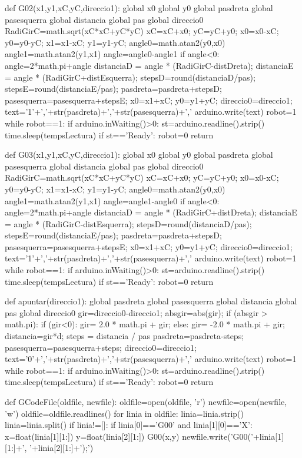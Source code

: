 \begin{python}
	def G02(x1,y1,xC,yC,direccio1):
		global x0
		global y0
		global pasdreta
		global pasesquerra
		global distancia
		global pas
		global direccio0
		RadiGirC=math.sqrt(xC*xC+yC*yC)
		xC=xC+x0;
		yC=yC+y0;
		x0=x0-xC;
		y0=y0-yC;
		x1=x1-xC;
		y1=y1-yC;
		angle0=math.atan2(y0,x0)
		angle1=math.atan2(y1,x1)
		angle=angle0-angle1
		if angle<0:
			angle=2*math.pi+angle
		distanciaD = angle * (RadiGirC-distDreta);
		distanciaE = angle * (RadiGirC+distEsquerra);
		stepsD=round(distanciaD/pas);
		stepsE=round(distanciaE/pas);
		pasdreta=pasdreta+stepsD;
		pasesquerra=pasesquerra+stepsE;
		x0=x1+xC;
		y0=y1+yC;
		direccio0=direccio1;
		text='1'+','+str(pasdreta)+','+str(pasesquerra)+','
		arduino.write(text)
		robot=1
		while robot==1:
			if arduino.inWaiting()>0:
				st=arduino.readline().strip()
				time.sleep(tempsLectura)
				if st=='Ready':
					robot=0
		return
	
	def G03(x1,y1,xC,yC,direccio1):
		global x0
		global y0
		global pasdreta
		global pasesquerra
		global distancia
		global pas
		global direccio0
		RadiGirC=math.sqrt(xC*xC+yC*yC)
		xC=xC+x0;
		yC=yC+y0;
		x0=x0-xC;
		y0=y0-yC;
		x1=x1-xC;
		y1=y1-yC;
		angle0=math.atan2(y0,x0)
		angle1=math.atan2(y1,x1)
		angle=angle1-angle0
		if angle<0:
			angle=2*math.pi+angle
		distanciaD = angle * (RadiGirC+distDreta);
		distanciaE = angle * (RadiGirC-distEsquerra);
		stepsD=round(distanciaD/pas);
		stepsE=round(distanciaE/pas);
		pasdreta=pasdreta+stepsD;
		pasesquerra=pasesquerra+stepsE;
		x0=x1+xC;
		y0=y1+yC;
		direccio0=direccio1;
		text='1'+','+str(pasdreta)+','+str(pasesquerra)+','
		arduino.write(text)
		robot=1
		while robot==1:
			if arduino.inWaiting()>0:
				st=arduino.readline().strip()
				time.sleep(tempsLectura)
				if st=='Ready':
					robot=0
		return
	
	def apuntar(direccio1):
		global pasdreta
		global pasesquerra
		global distancia
		global pas
		global direccio0
		gir=direccio0-direccio1;
		absgir=abs(gir);
		if (absgir > math.pi):
			if (gir<0):
				gir= 2.0 * math.pi + gir;
			else:
				gir= -2.0 * math.pi + gir;
		distancia=gir*d;
		steps = distancia / pas
		pasdreta=pasdreta-steps;
		pasesquerra=pasesquerra+steps;
		direccio0=direccio1;
		text='0'+','+str(pasdreta)+','+str(pasesquerra)+','
		arduino.write(text)
		robot=1
		while robot==1:
			if arduino.inWaiting()>0:
				st=arduino.readline().strip()
				time.sleep(tempsLectura)
				if st=='Ready':
					robot=0
		return
	
	
	def GCodeFile(oldfile, newfile):
		oldfile=open(oldfile, 'r')
		newfile=open(newfile, 'w')
		oldfile=oldfile.readlines()
		for linia in oldfile:
			linia=linia.strip()
			linia=linia.split()
			if linia!=[]:
				if linia[0]=='G00' and linia[1][0]=='X':
					x=float(linia[1][1:])
					y=float(linia[2][1:])
					G00(x,y)
					newfile.write('G00('+linia[1][1:]+', '+linia[2][1:]+');\n')
			

\end{python}
